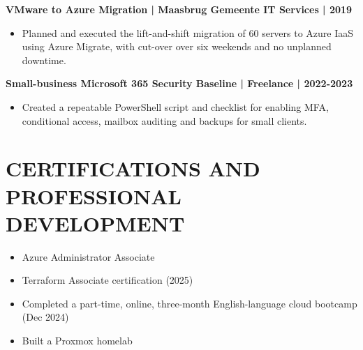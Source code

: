 \documentclass[11pt,a4paper]{article}
\begin{document}
\textbf{VMware to Azure Migration | Maasbrug Gemeente IT Services | 2019}
\begin{itemize}
\item Planned and executed the lift-and-shift migration of 60 servers to Azure IaaS using Azure Migrate, with cut-over over six weekends and no unplanned downtime.
\end{itemize}

\textbf{Small-business Microsoft 365 Security Baseline | Freelance | 2022-2023}
\begin{itemize}
\item Created a repeatable PowerShell script and checklist for enabling MFA, conditional access, mailbox auditing and backups for small clients.
\end{itemize}

\section*{CERTIFICATIONS AND PROFESSIONAL DEVELOPMENT}
\begin{itemize}
\item Azure Administrator Associate
\item Terraform Associate certification (2025)
\item Completed a part-time, online, three-month English-language cloud bootcamp (Dec 2024)
\item Built a Proxmox homelab
\end{itemize}
\end{document}

